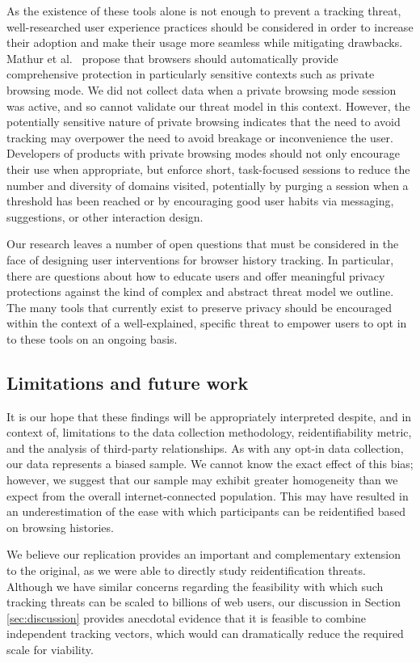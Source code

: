 \documentclass[letterpaper,twocolumn,10pt]{article}
\begin{document}
As the existence of these tools alone is not enough to prevent a tracking threat, well-researched user experience practices should be considered in order to increase their adoption and make their usage more seamless while mitigating drawbacks.
Mathur et al.~\cite{MathurPreventOnlineTracking} propose that browsers should automatically provide comprehensive protection in particularly sensitive contexts such as private browsing mode.
We did not collect data when a private browsing mode session was active, and so cannot validate our threat model in this context. 
However, the potentially sensitive nature of private browsing indicates that the need to avoid tracking may overpower the need to avoid breakage or inconvenience the user.
Developers of products with private browsing modes should not only encourage their use when appropriate, but enforce short, task-focused sessions to reduce the number and diversity of domains visited, potentially by purging a session when a threshold has been reached or by encouraging good user habits via messaging, suggestions, or other interaction design.

Our research leaves a number of open questions that must be considered in the face of designing user interventions for browser history tracking. 
In particular, there are questions about how to educate users and offer meaningful privacy protections against the kind of complex and abstract threat model we outline.
The many tools that currently exist to preserve privacy should be encouraged within the context of a well-explained, specific threat to empower users to opt in to these tools on an ongoing basis.
%
\subsection{Limitations and future work}
\label{sec:limitations}
%
It is our hope that these findings will be appropriately interpreted despite, and in context of, limitations to the data collection methodology, reidentifiability metric, and the analysis of third-party relationships.
As with any opt-in data collection, our data represents a biased sample. 
We cannot know the exact effect of this bias; however, we suggest that our sample may exhibit greater homogeneity than we expect from the overall internet-connected population.
This may have resulted in an underestimation of the ease with which participants can be reidentified based on browsing histories.

We believe our replication provides an important and complementary extension to the original, as we were able to directly study reidentification threats.
Although we have similar concerns regarding the feasibility with which such tracking threats can be scaled to billions of web users, our discussion in Section \ref{sec:discussion} provides anecdotal evidence that it is feasible to combine independent tracking vectors, which would can dramatically reduce the required scale for viability.
\end{document}
